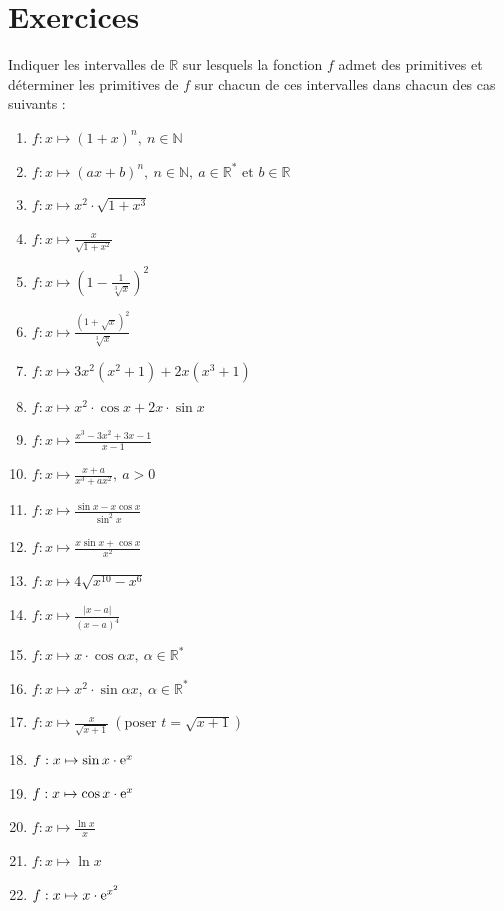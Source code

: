 \section{Exercices}
\begin{exo}
      Indiquer les intervalles de $\mathbb{R}$ sur lesquels la fonction $f$ admet des primitives et
      d\'eterminer les primitives de $f$ sur chacun de ces intervalles dans chacun des cas suivants : 
            \begin{enumerate}
                  \item $f : x \mapsto (1+x)^n,\ n \in \mathbb{N}$
                  \item $f : x \mapsto (ax+b)^n,\ n \in \mathbb{N},\ a\in\mathbb{R}^* \text{ et } b\in \mathbb{R}$
                  \item $f : x \mapsto x^2 \cdot \sqrt{1+x^3}$
                  \item $f : x \mapsto \frac{x}{\sqrt{1+x^2}}$
                  \item $f : x \mapsto \left( 1 - \frac{1}{\sqrt[3]{x}} \right)^2$
                  \item $f : x \mapsto \frac{\left(1+\sqrt{x}\right)^2}{\sqrt[3]{x}}$
                  \item $f : x \mapsto 3x^2 (x^2+1) + 2x (x^3 + 1)$
                  \item $f : x \mapsto x^2 \cdot \cos x + 2x \cdot \sin x$
                  \item $f : x \mapsto \frac{x^3 - 3x^2 + 3x -1}{x-1}$
                  \item $f : x \mapsto \frac{x+a}{x^3 + a x^2} ,\ a>0$
                  \item $f : x \mapsto \frac{\sin x - x \cos x}{\sin^2 x}$
                  \item $f : x \mapsto \frac{x \sin x + \cos x}{x^2}$
                  \item $f : x \mapsto 4\sqrt{x^{10} - x^6}$
                  \item $f : x \mapsto \frac{|x-a|}{(x-a)^4}$
                  \item $f : x \mapsto x\cdot \cos \alpha x ,\ \alpha \in \mathbb{R}^*$
                  \item $f : x \mapsto x^2 \cdot \sin \alpha x,\ \alpha \in \mathbb{R}^*$
                  \item $f : x \mapsto \frac{x}{\sqrt{x+1}} \ (\text{poser $t=\sqrt{x+1}$})$
                  \item $f : x \mapsto \sin x \cdot \mathrm{e}^{x}$
                  \item $f : x \mapsto \cos x \cdot \mathrm{e}^{x}$
                  \item $f : x \mapsto \frac{\ln x}{x}$
                  \item $f : x \mapsto \ln x$
                  \item $f : x \mapsto x \cdot \mathrm{e}^{x^2}$
            \end{enumerate}
\end{exo}
